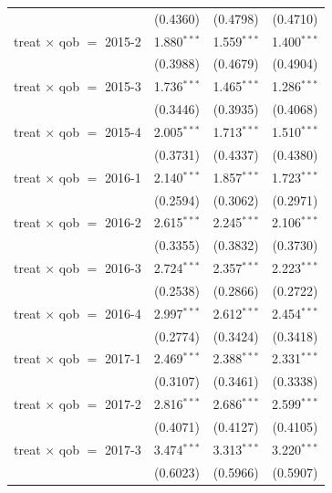 \begin{table}[htbp]
\begin{tabular}{lccc}
                                     & (0.4360)      & (0.4798)       & (0.4710)\\   
      treat $\times$ qob $=$ 2015-2  & 1.880$^{***}$ & 1.559$^{***}$  & 1.400$^{***}$\\   
                                     & (0.3988)      & (0.4679)       & (0.4904)\\   
      treat $\times$ qob $=$ 2015-3  & 1.736$^{***}$ & 1.465$^{***}$  & 1.286$^{***}$\\   
                                     & (0.3446)      & (0.3935)       & (0.4068)\\   
      treat $\times$ qob $=$ 2015-4  & 2.005$^{***}$ & 1.713$^{***}$  & 1.510$^{***}$\\   
                                     & (0.3731)      & (0.4337)       & (0.4380)\\   
      treat $\times$ qob $=$ 2016-1  & 2.140$^{***}$ & 1.857$^{***}$  & 1.723$^{***}$\\   
                                     & (0.2594)      & (0.3062)       & (0.2971)\\   
      treat $\times$ qob $=$ 2016-2  & 2.615$^{***}$ & 2.245$^{***}$  & 2.106$^{***}$\\   
                                     & (0.3355)      & (0.3832)       & (0.3730)\\   
      treat $\times$ qob $=$ 2016-3  & 2.724$^{***}$ & 2.357$^{***}$  & 2.223$^{***}$\\   
                                     & (0.2538)      & (0.2866)       & (0.2722)\\   
      treat $\times$ qob $=$ 2016-4  & 2.997$^{***}$ & 2.612$^{***}$  & 2.454$^{***}$\\   
                                     & (0.2774)      & (0.3424)       & (0.3418)\\   
      treat $\times$ qob $=$ 2017-1  & 2.469$^{***}$ & 2.388$^{***}$  & 2.331$^{***}$\\   
                                     & (0.3107)      & (0.3461)       & (0.3338)\\   
      treat $\times$ qob $=$ 2017-2  & 2.816$^{***}$ & 2.686$^{***}$  & 2.599$^{***}$\\   
                                     & (0.4071)      & (0.4127)       & (0.4105)\\   
      treat $\times$ qob $=$ 2017-3  & 3.474$^{***}$ & 3.313$^{***}$  & 3.220$^{***}$\\   
                                     & (0.6023)      & (0.5966)       & (0.5907)\\   

\end{tabular}
\end{table}
